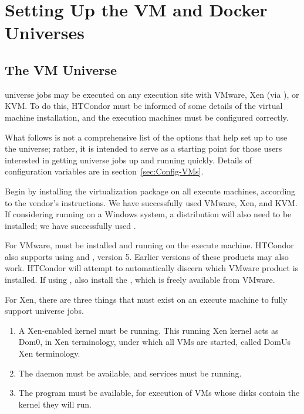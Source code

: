 \section{Setting Up the VM and Docker Universes}\label{sec:vm-install}

\subsection{\label{sec:vm-universe}The VM Universe}

 universe jobs may
be executed on any execution site with VMware, Xen
(via ), or KVM.
To do this, HTCondor must be informed of some details of the 
virtual machine installation, and the execution machines must
be configured correctly.

What follows is not a comprehensive list of the options that
help set up to use the  universe; rather,
it is intended to serve as a starting point for those users interested in
getting  universe jobs up and running quickly.
Details of configuration variables are in section~\ref{sec:Config-VMs}.

Begin by installing the virtualization package on all execute machines,
according to the vendor's instructions.
We have successfully used VMware, Xen, and KVM.
If considering running on a Windows system, 
a  distribution will also need to be installed;
we have successfully used . 

For VMware,  must be installed
and running on the execute machine.
HTCondor also
supports using  and , version 5.
Earlier versions of these products may also work.  
HTCondor will attempt to automatically discern which 
VMware product is installed.
If using , also install the ,
which is freely available from VMware.

For Xen, there are three things that must exist on 
an execute machine to fully support  universe jobs. 
\begin{enumerate}
\item
A Xen-enabled kernel must be running. 
This running Xen kernel acts as Dom0, in Xen terminology, 
under which all VMs are started, called DomUs Xen terminology. 

\item
The  daemon must be available,
and  services must be running. 

\item
The  program must be available,
for execution of VMs whose disks contain the kernel they will run.
\end{enumerate}

